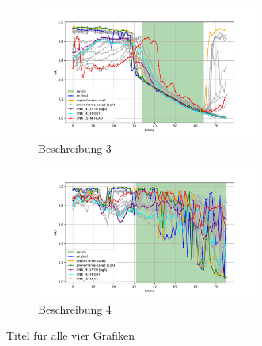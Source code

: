 \begin{figure}[H]
    \begin{subfigure}[b]{1\textwidth}
        \centering
        \includegraphics[width=0.8\textwidth]{PICs/experiments/temporalModels/plot_ious_sequence_1.pdf}
        \caption{Beschreibung 3}
        \label{fig:grafik3}
    \end{subfigure}
    \begin{subfigure}[b]{1\textwidth}
        \centering
        \includegraphics[width=0.8\textwidth]{PICs/experiments/temporalModels/plot_ious_sequence_3.pdf}
        \caption{Beschreibung 4}
        \label{fig:grafik4}
    \end{subfigure}

    \caption{Titel für alle vier Grafiken}
    \label{fig:4grafiken}
\end{figure}


